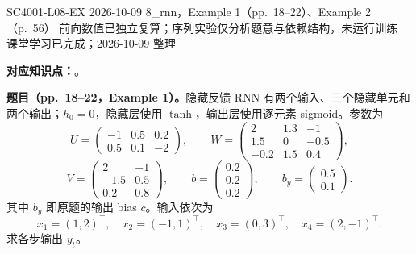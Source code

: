 

\examplemeta
  {SC4001-L08-EX}
  {2026-10-09}
  {8\_rnn，Example 1（pp.~18--22）、Example 2（p.~56）}
  {前向数值已独立复算；序列实验仅分析题意与依赖结构，未运行训练}
  {课堂学习已完成；2026-10-09 整理}


\textbf{对应知识点：}。

\textbf{题目（pp.~18--22，Example 1）。}隐藏反馈 RNN 有两个输入、三个隐藏单元和两个输出；$h_0=0$，隐藏层使用 $\tanh$，输出层使用逐元素 sigmoid。参数为
\[
 U=\begin{pmatrix}-1&0.5&0.2\\0.5&0.1&-2\end{pmatrix},\qquad
 W=\begin{pmatrix}2&1.3&-1\\1.5&0&-0.5\\-0.2&1.5&0.4\end{pmatrix},
\]
\[
 V=\begin{pmatrix}2&-1\\-1.5&0.5\\0.2&0.8\end{pmatrix},\qquad
 b=\begin{pmatrix}0.2\\0.2\\0.2\end{pmatrix},\qquad
 b_y=\begin{pmatrix}0.5\\0.1\end{pmatrix}.
\]
其中 $b_y$ 即原题的输出 bias $c$。输入依次为
\[
 x_1=(1,2)^\top,\quad x_2=(-1,1)^\top,\quad
 x_3=(0,3)^\top,\quad x_4=(2,-1)^\top.
\]
求各步输出 $y_t$。

